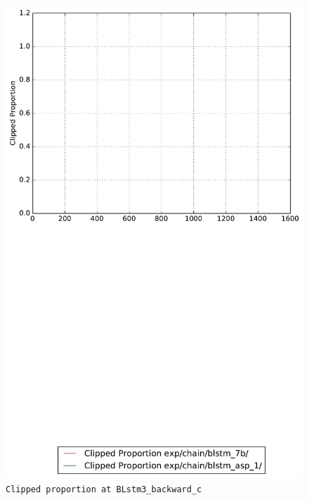 \documentclass[prl,10pt,twocolumn]{revtex4}
\begin{document}
\newpage
\begin{figure}[h]
  \begin{center}
    \caption{\texttt{Clipped proportion at BLstm3\_backward\_c}}
    \includegraphics[width=\textwidth]{exp/chain/blstm_7b/report/clipped_proportion_BLstm3_backward_c.pdf}
  \end{center}
\end{figure}
\clearpage
\end{document}
